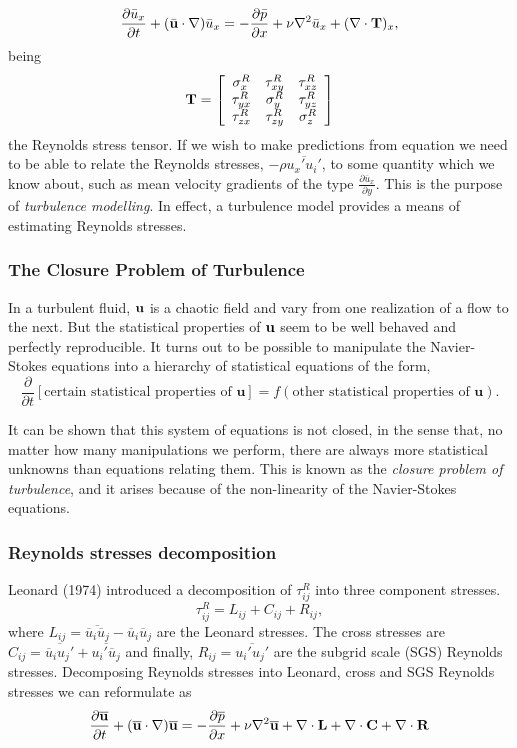 \begin{equation}
\label{eq-momentum_x_reynolds}
\frac{\partial \bar{u}_x}{\partial t}+(\bar{\mathbf{u}}\cdot\nabla)\bar{u}_x=-\frac{\partial\bar{p}}{\partial x}+\nu\nabla^2\bar{u}_x+(\nabla\cdot{\bf T})_x,
\end{equation}
being
$${\bf T}=\left[\begin{array}{ccc}
\sigma_x^R&\tau_{xy}^R&\tau_{xz}^R\\
\tau_{yx}^R&\sigma_y^R&\tau_{yz}^R\\
\tau_{zx}^R&\tau_{zy}^R&\sigma_z^R
\end{array}\right]$$
the Reynolds stress tensor. If we wish to make predictions from equation  we need to be able to relate the Reynolds stresses, $ -\rho\overline{u_x'u_i'} $, to some quantity which we know about, such as mean velocity gradients of the type $ \frac{\partial\overline{u}_x}{\partial y} $. This is the purpose of \textit{turbulence modelling}. In effect, a turbulence model provides a means of estimating Reynolds stresses.

\subsubsection{The Closure Problem of Turbulence}
In a turbulent fluid, ${\bf u}$ is a chaotic field and vary from one realization of a flow to the next. But the statistical properties of ${\bf u}$ seem to be well behaved and perfectly reproducible. It turns out to be possible to manipulate the Navier-Stokes equations into a hierarchy of statistical equations of the form, 
$$\frac{\partial}{\partial t}[\mbox{certain statistical properties of }\mathbf{u}]=f(\mbox{other statistical properties of }\mathbf{u}).$$

It can be shown that this system of equations is not closed, in the sense that, no matter how many manipulations we perform, there are always more statistical unknowns than equations relating them. This is known as the \textit{closure problem of turbulence}, and it arises because of the non-linearity of the Navier-Stokes equations.

\subsubsection{Reynolds stresses decomposition}
\label{subsubsec:reynolds_decomposition}
Leonard (1974) introduced a decomposition of $\tau_{ij}^R$ into three component stresses.
$$\tau_{ij}^R=L_{ij}+C_{ij}+R_{ij},$$
where $L_{ij}=\overline{\overline{u}_i\overline{u}_j}-\overline{u}_i\overline{u}_j$ are the Leonard stresses. The cross stresses are $C_{ij}=\overline{\overline{u}_iu_j'}+\overline{u_i'\overline{u}_j}$ and finally, $R_{ij}=\overline{u_i'u_j'}$ are the subgrid scale (SGS) Reynolds stresses. Decomposing Reynolds stresses into Leonard, cross and SGS Reynolds stresses we can reformulate  as
$$\frac{\partial \overline{{\bf u}}}{\partial t}+(\overline{{\bf u}}\cdot\nabla)\overline{{\bf u}}=-\frac{\partial\overline{p}}{\partial x}+\nu\nabla^2\overline{{\bf u}}+\nabla\cdot{\bf L}+\nabla\cdot{\bf C}+\nabla\cdot{\bf R}$$

